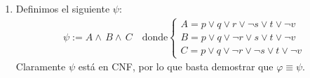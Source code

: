 \begin{enumerate}
    \item Definimos el siguiente $\psi$:
    \begin{align*}
    \psi:=A\wedge\,B\wedge\,C \quad \text{donde} \left\{
                \begin{array}{ll}
                  A=p \lor q \lor r \lor \neg s \lor t \lor \neg v\\
                  B=p \lor q \lor \neg r \lor s \lor t \lor \neg v\\
                  C=p \lor q \lor \neg r \lor \neg s \lor t \lor \neg v
                \end{array}
              \right.
    \end{align*}
    Claramente $\psi$ está en CNF, por lo que basta demostrar que $\varphi \equiv \psi$. 
    

\end{enumerate}
